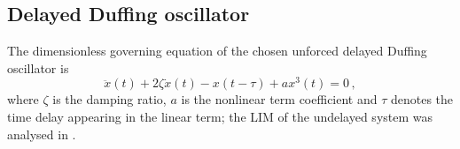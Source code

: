 \documentclass[preprint,12pt]{elsarticle}
\begin{document}
	
	\subsection{Delayed Duffing oscillator}\label{sec:Duffing}
	
	The dimensionless governing equation of the chosen unforced delayed Duffing oscillator is
	\begin{equation}
	\ddot{x}(t)+2\zeta\dot{x}(t)-x(t-\tau)+ax^3(t) = 0\,,
	\end{equation}
	where $\zeta$ is the damping ratio, $a$ is the nonlinear term coefficient and $\tau$ denotes the time delay appearing in the linear term; the LIM of the undelayed system was analysed in \cite{habib2021dynamical}.
	
\end{document}
